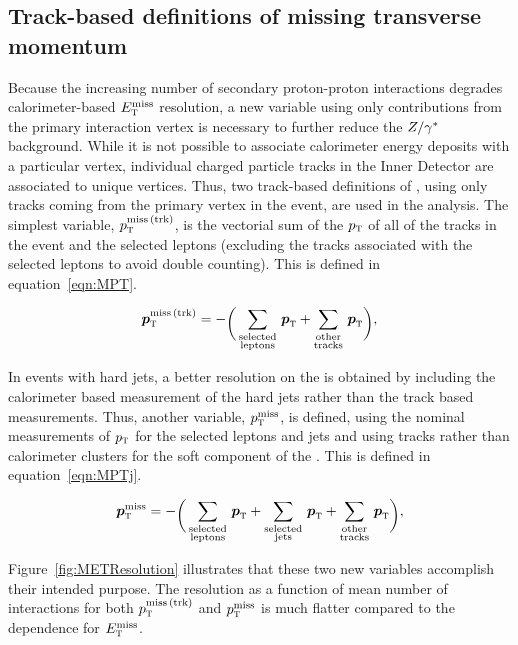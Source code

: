 \subsection{Track-based definitions of missing transverse momentum}

Because the increasing number of secondary proton-proton interactions degrades calorimeter-based $E_{\textrm{\footnotesize\sc t}}^{\rm miss}$ resolution, a new variable using only contributions from the primary interaction vertex is necessary to further reduce the $Z/\gamma^{\ast}$ background. While it is not possible to associate calorimeter energy deposits with a particular vertex, individual charged particle tracks in the Inner Detector are associated to unique vertices. Thus, two track-based definitions of \met, using only tracks coming from the primary vertex in the event, are used in the analysis. The simplest variable, $p_{\textrm{\footnotesize\sc t}}^{\rm miss\,(trk)}$, is the vectorial sum of the $p_{\textrm{\footnotesize\sc t}}$ of all of the tracks in the event and the selected leptons (excluding the tracks associated with the selected leptons to avoid double counting). This is defined in equation~\ref{eqn:MPT}.

\begin{equation}
\vMPT = -\raisebox{-3.0pt}{\bigg(}%
     \displaystyle
     \sum_{\substack{\rm selected \\ \rm leptons}}\,\vpT
   + \sum_{\substack{\rm other \\ \rm tracks}}\,\vpT
   \raisebox{-3.0pt}{\bigg)},
\label{eqn:MPT}
\end{equation} 

In events with hard jets, a better resolution on the \met is obtained by including the calorimeter based measurement of the hard jets rather than the track based measurements. Thus, another variable, $p_{\textrm{\footnotesize\sc t}}^{\rm miss}$, is defined, using the nominal measurements of $p_{\textrm{\footnotesize\sc t}}$ for the selected leptons and jets and using tracks rather than calorimeter clusters for the soft component of the \met. This is defined in equation~\ref{eqn:MPTj}.

\begin{equation}
\vMPTj = -\raisebox{-3.0pt}{\bigg(}%
     \displaystyle
     \sum_{\substack{\rm selected \\ \rm leptons}}\,\vpT
   + \sum_{\substack{\rm selected \\ \rm jets}}\,\vpT
   + \sum_{\substack{\rm other \\ \rm tracks}}\,\vpT
   \raisebox{-3.0pt}{\bigg)},
\label{eqn:MPTj}
\end{equation} 

Figure~\ref{fig:METResolution} illustrates that these two new variables accomplish their intended purpose. The resolution as a function of mean number of interactions for both $p_{\textrm{\footnotesize\sc t}}^{\rm miss\,(trk)}$ and $p_{\textrm{\footnotesize\sc t}}^{\rm miss}$ is much flatter compared to the dependence for $E_{\textrm{\footnotesize\sc t}}^{\rm miss}$. 

